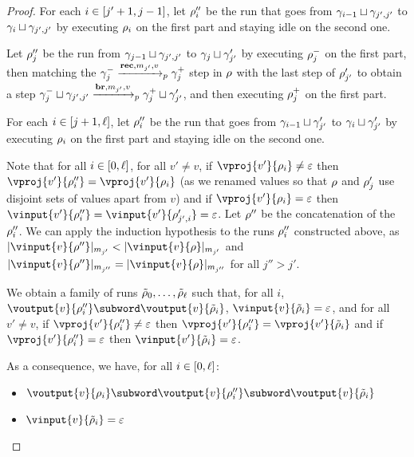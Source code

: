 \begin{proof}
	For each $i \in [j'+1,j-1]$, let $\rho''_i$ be the run that goes from $\gamma_{i-1} \sqcup \gamma_{j', j'}$ to $\gamma_{i} \sqcup \gamma_{j', j'}$ by executing $\rho_i$ on the first part and staying idle on the second one.
	
	Let $\rho''_j$ be the run from $\gamma_{j-1} \sqcup \gamma_{j', j'}$ to $\gamma_{j} \sqcup \gamma'_{j'}$ by executing $\rho_{j}^-$ on the first part, then matching the $\gamma_j^- \xrightarrow{\textbf{rec}, m_{j'}, v}_{p} \gamma_j^+$ step in $\rho$ with the last step of $\rho'_{j'}$ to obtain a  step $\gamma_j^- \sqcup \gamma_{j', j'} \xrightarrow{\textbf{br}, m_{j'}, v}_{p} \gamma_j^+ \sqcup \gamma'_{j'}$, and then executing $\rho_{j}^+$ on the first part.
	
	For each $i \in [j+1,\ell]$, let $\rho''_i$ be the run that goes from $\gamma_{i-1} \sqcup \gamma'_{j'}$ to $\gamma_{i} \sqcup \gamma'_{j'}$ by executing $\rho_i$ on the first part and staying idle on the second one.
	
	Note that for all $i \in [0,\ell]$, for all $v' \neq v$, if $\vproj{v'}{\run_i} \neq \epsilon$ then $\vproj{v'}{\run''_i} = \vproj{v'}{\run_i}$ (as we renamed values so that $\rho$ and $\rho'_j$ use disjoint sets of values apart from $v$) and if $\vproj{v'}{\run_i} = \epsilon$ then $\vinput{v'}{\run''_i} = \vinput{v'}{\run'_{j',i}} = \epsilon$.
	Let $\rho''$ be the concatenation of the $\rho''_i$.
	We can apply the induction hypothesis to the runs $\rho''_i$ constructed above, as $\size{\vinput{v}{\run''}}_{m_{j'}} < \size{\vinput{v}{\run}}_{m_{j'}}$ and $\size{\vinput{v}{\run''}}_{m_{j''}} = \size{\vinput{v}{\run}}_{m_{j''}}$ for all $j''>j'$.
	
	We obtain a family of runs $\Tilde{\rho}_0, \ldots, \Tilde{\rho}_\ell$ such that, for all $i$, $\voutput{v}{\run''_i} \subword \voutput{v}{\Tilde{\run}_i}$, $\vinput{v}{\Tilde{\run}_i} = \epsilon$, and for all $v' \neq v$, if $\vproj{v'}{\run''_i} \neq \epsilon$ then $\vproj{v'}{\run''_i} = \vproj{v'}{\Tilde{\run}_i}$ and if $\vproj{v'}{\run''_i} = \epsilon$ then $\vinput{v'}{\Tilde{\run}_i} = \epsilon$.
	
	As a consequence, we have, for all $i\in[0,\ell]$:
	\begin{itemize}
		\item $\voutput{v}{\run_i} \subword \voutput{v}{\run''_i} \subword \voutput{v}{\Tilde{\run}_i}$
		
		\item $\vinput{v}{\Tilde{\run}_i} = \epsilon$
		

\end{itemize}
\end{proof}
